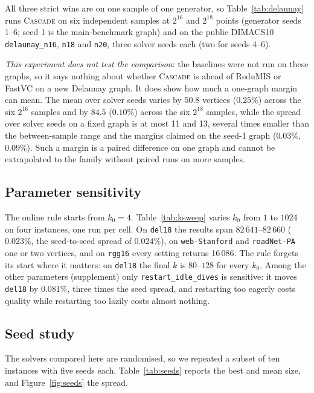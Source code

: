 \documentclass[review,authoryear,11pt]{elsarticle}
\theoremstyle{definition}
\begin{document}
All three strict wins are on one sample of one generator, so Table~\ref{tab:delaunay}
runs \textsc{Cascade} on six independent samples at $2^{16}$ and $2^{18}$ points
(generator seeds 1--6; seed 1 is the main-benchmark graph) and on the public DIMACS10
\texttt{delaunay\_n16}, \texttt{n18} and \texttt{n20}, three solver seeds each (two for
seeds 4--6).



\emph{This experiment does not test the comparison}: the baselines were not run on these
graphs, so it says nothing about whether \textsc{Cascade} is ahead of ReduMIS or FastVC
on a new Delaunay graph. It does show how much a one-graph margin can mean. The mean over
solver seeds varies by $50.8$ vertices ($0.25\%$) across the six $2^{16}$ samples and by
$84.5$ ($0.10\%$) across the six $2^{18}$ samples, while the spread over solver seeds on
a fixed graph is at most 11 and 13, several times smaller than the between-sample range and
the margins claimed on the seed-1 graph ($0.03\%$, $0.09\%$). Such a margin is a paired
difference on one graph and cannot be extrapolated to the family without paired runs on
more samples.

\subsection{Parameter sensitivity}
\label{sec:sensitivity}

The online rule starts from $k_0=4$. Table~\ref{tab:ksweep} varies $k_0$ from $1$ to
$1024$ on four instances, one run per cell. On \texttt{del18} the results span
$82\,641$--$82\,660$ ($0.023\%$, the seed-to-seed spread of $0.024\%$), on
\texttt{web-Stanford} and \texttt{roadNet-PA} one or two vertices, and on \texttt{rgg16}
every setting returns 16\,086. The rule forgets its start where it matters: on
\texttt{del18} the final $k$ is $80$--$128$ for every $k_0$. Among the other parameters
(supplement) only \texttt{restart\_idle\_dives} is sensitive: it moves \texttt{del18}
by $0.081\%$, three times the seed spread, and restarting too eagerly costs quality
while restarting too lazily costs almost nothing.



\subsection{Seed study}

The solvers compared here are randomised, so we repeated a subset of ten
instances with five seeds each. Table~\ref{tab:seeds} reports the best and mean
size, and Figure~\ref{fig:seeds} the spread.
\end{document}
